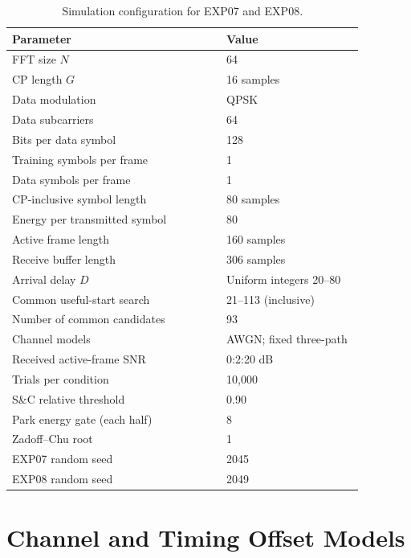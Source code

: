 \begin{table}[htbp]
\centering
\caption{Simulation configuration for EXP07 and EXP08.}
\label{tab:method_config}
\small
\begin{tabular}{p{0.53\linewidth}p{0.34\linewidth}}
\hline
Parameter & Value \\ \hline
FFT size $N$ & 64\\
CP length $G$ & 16 samples\\
Data modulation & QPSK\\
Data subcarriers & 64\\
Bits per data symbol & 128\\
Training symbols per frame & 1\\
Data symbols per frame & 1\\
CP-inclusive symbol length & 80 samples\\
Energy per transmitted symbol & 80\\
Active frame length & 160 samples\\
Receive buffer length & 306 samples\\
Arrival delay $D$ & Uniform integers 20--80\\
Common useful-start search & 21--113 (inclusive)\\
Number of common candidates & 93\\
Channel models & AWGN; fixed three-path\\
Received active-frame SNR & 0:2:20 dB\\
Trials per condition & 10,000\\
S\&C relative threshold & 0.90\\
Park energy gate (each half) & 8\\
Zadoff--Chu root & 1\\
EXP07 random seed & 2045\\
EXP08 random seed & 2049\\ \hline
\end{tabular}
\end{table}

\section{Channel and Timing Offset Models}
